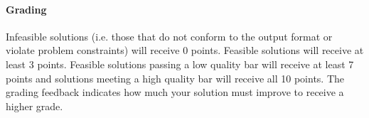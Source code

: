\paragraph{Grading}
Infeasible solutions (i.e. those that do not conform to the output format or violate problem constraints) will receive 0 points.  Feasible solutions will receive at least 3 points.  Feasible solutions passing a low quality bar will receive at least 7 points and solutions meeting a high quality bar will receive all 10 points.  The grading feedback indicates how much your solution must improve to receive a higher grade.

